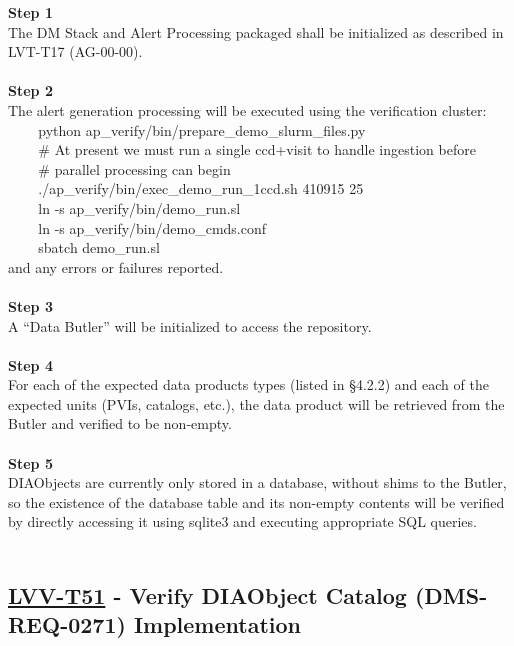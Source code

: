 \textbf{Step 1}\\
The DM Stack and Alert Processing packaged shall be initialized as
described in LVT-T17 (AG-00-00).\\
~\\
\textbf{Step 2}\\
The alert generation processing will be executed using the verification
cluster:\\
\hspace*{0.333em} ~ ~ ~python
ap\_verify/bin/prepare\_demo\_slurm\_files.py\\
\hspace*{0.333em} ~ ~ ~\# At present we must run a single ccd+visit to
handle ingestion before\\
\hspace*{0.333em} ~ ~ ~\# parallel processing can begin\\
\hspace*{0.333em} ~ ~ ~./ap\_verify/bin/exec\_demo\_run\_1ccd.sh 410915
25\\
\hspace*{0.333em} ~ ~ ~ln -s ap\_verify/bin/demo\_run.sl\\
\hspace*{0.333em} ~ ~ ~ln -s ap\_verify/bin/demo\_cmds.conf\\
\hspace*{0.333em} ~ ~ ~sbatch demo\_run.sl\\
and any errors or failures reported.\\
~\\
\textbf{Step 3}\\
A ``Data Butler'' will be initialized to access the repository.\\
~\\
\textbf{Step 4}\\
For each of the expected data products types (listed in §4.2.2) and each
of the expected units (PVIs, catalogs, etc.), the data product will be
retrieved from the Butler and verified to be non-empty.\\
~\\
\textbf{Step 5}\\
DIAObjects are currently only stored in a database, without shims to the
Butler, so the existence of the database table and its non-empty
contents will be verified by directly accessing it using sqlite3 and
executing appropriate SQL queries.\\
~\\

\hypertarget{lvv-t51---verify-diaobject-catalog-dms-req-0271-implementation}{%
\subsection{\texorpdfstring{\href{https://jira.lsstcorp.org/secure/Tests.jspa\#/testCase/LVV-T51}{LVV-T51}
- Verify DIAObject Catalog (DMS-REQ-0271)
Implementation}{LVV-T51 - Verify DIAObject Catalog (DMS-REQ-0271) Implementation}}\label{lvv-t51---verify-diaobject-catalog-dms-req-0271-implementation}}


